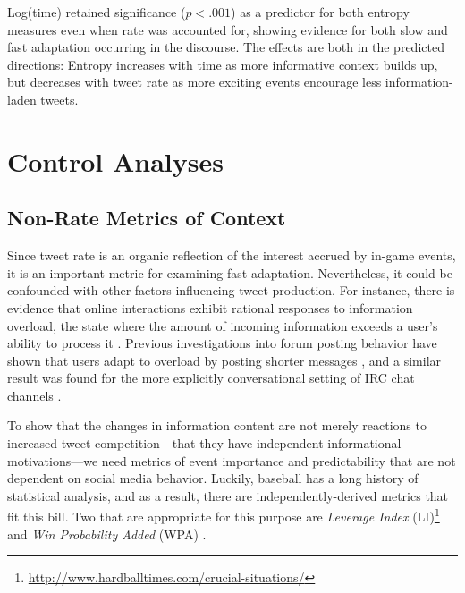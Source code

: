 \documentclass[11pt,letterpaper]{article}
\begin{document}
Log(time) retained significance ($p<.001$) as a predictor for both entropy measures even when rate was accounted for, showing evidence for both slow and fast adaptation occurring in the discourse.  The effects are both in the predicted directions: Entropy increases with time as more informative context builds up, but decreases with tweet rate as more exciting events encourage less information-laden tweets.

\section{Control Analyses}

\subsection{Non-Rate Metrics of Context}\label{sect:other-metrics}

Since tweet rate is an organic reflection of the interest accrued by in-game events, it is an important metric for examining fast adaptation. Nevertheless, it could be confounded with other factors influencing tweet production.  For instance, there is evidence that online interactions exhibit rational responses to information overload, the state where the amount of incoming information exceeds a user's ability to process it \cite{miller1956,schoberth2003}.  Previous investigations into forum posting behavior have shown that users adapt to overload by posting shorter messages \cite{jones2001a,jones2001b,whittaker2003,schoberth2003}, and a similar result was found for the more explicitly conversational setting of IRC chat channels \cite{jones2008}.   

To show that the changes in information content are not merely reactions to increased tweet competition---that they have independent informational motivations---we need metrics of event importance and predictability that are not dependent on social media behavior.  Luckily, baseball has a long history of statistical analysis, and as a result, there are independently-derived metrics that fit this bill.  Two that are appropriate for this purpose are {\it Leverage Index} (LI)\footnote{\url{http://www.hardballtimes.com/crucial-situations/}} and  {\it Win Probability Added} (WPA) \cite{tango2007}.
\end{document}
